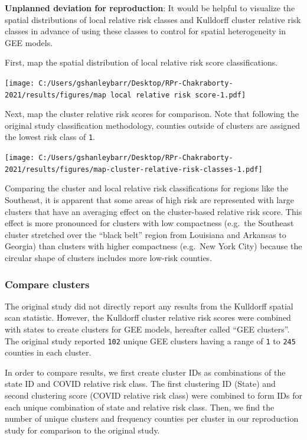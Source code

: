 \documentclass[
]{article}
\begin{document}
\textbf{Unplanned deviation for reproduction}: It would be helpful to
visualize the spatial distributions of local relative risk classes and
Kulldorff cluster relative risk classes in advance of using these
classes to control for spatial heterogeneity in GEE models.

First, map the spatial distribution of local relative risk score
classifications.

\texttt{[image: C:/Users/gshanleybarr/Desktop/RPr-Chakraborty-2021/results/figures/map local relative risk score-1.pdf]}

Next, map the cluster relative risk scores for comparison. Note that
following the original study classification methodology, counties
outside of clusters are assigned the lowest risk class of \texttt{1}.

\texttt{[image: C:/Users/gshanleybarr/Desktop/RPr-Chakraborty-2021/results/figures/map-cluster-relative-risk-classes-1.pdf]}

Comparing the cluster and local relative risk classifications for
regions like the Southeast, it is apparent that some areas of high risk
are represented with large clusters that have an averaging effect on the
cluster-based relative risk score. This effect is more pronounced for
clusters with low compactness (e.g.~the Southeast cluster stretched over
the ``black belt'' region from Louisiana and Arkansas to Georgia) than
clusters with higher compactness (e.g.~New York City) because the
circular shape of clusters includes more low-risk counties.

\hypertarget{compare-clusters}{%
\subsubsection{Compare clusters}\label{compare-clusters}}

The original study did not directly report any results from the
Kulldorff spatial scan statistic. However, the Kulldorff cluster
relative risk scores were combined with states to create clusters for
GEE models, hereafter called ``GEE clusters''. The original study
reported \texttt{102} unique GEE clusters having a range of \texttt{1}
to \texttt{245} counties in each cluster.

In order to compare results, we first create cluster IDs as combinations
of the state ID and COVID relative risk class. The first clustering ID
(State) and second clustering score (COVID relative risk class) were
combined to form IDs for each unique combination of state and relative
risk class. Then, we find the number of unique clusters and frequency
counties per cluster in our reproduction study for comparison to the
original study.
\end{document}
